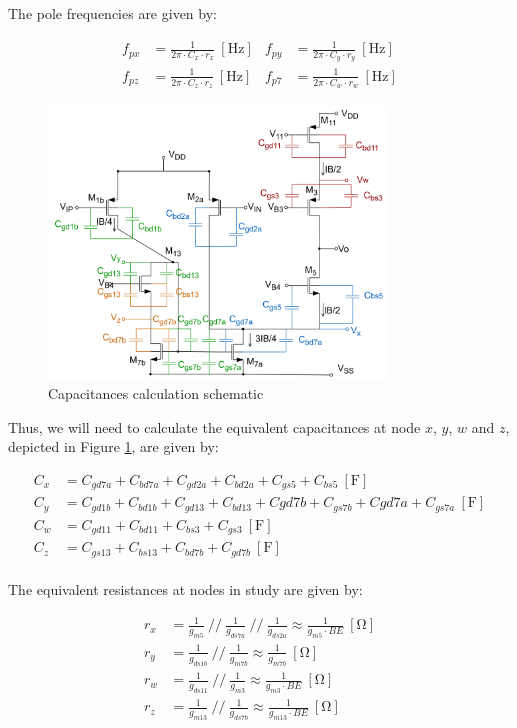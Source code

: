 The pole frequencies are given by:

\begin{align}
    f_{px} &= \frac{1}{2\pi \cdot C_x \cdot r_x} \ [\si{\hertz}] &
    f_{py} &= \frac{1}{2\pi \cdot C_y \cdot r_y} \ [\si{\hertz}] \\
    f_{pz} &= \frac{1}{2\pi \cdot C_z \cdot r_z} \ [\si{\hertz}] &
    f_{p7} &= \frac{1}{2\pi \cdot C_w \cdot r_w} \ [\si{\hertz}]
    \label{eq:poles}
\end{align}

\begin{figure}[H]
    \centering
    \includegraphics[width=0.8\textwidth]{Images/pole_freqs.png}
    \caption{Capacitances calculation schematic}
    \label{fig:poles_sch}
\end{figure}

Thus, we will need to calculate the equivalent capacitances at node $x$, $y$, $w$ and $z$, depicted in Figure \ref{fig:poles_sch}, are given by:

\begin{align}
    C_x &= C_{gd7a} + C_{bd7a}+ C_{gd2a} + C_{bd2a} + C_{gs5} + C_{bs5} \ [\si{\farad}] \\
    C_y &= C_{gd1b} + C_{bd1b} + C_{gd13} + C_{bd13} + C{gd7b} + C_{gs7b} + C{gd7a} + C_{gs7a}\ [\si{\farad}] \\
    C_w &= C_{gd11} + C_{bd11} + C_{bs3}+ C_{gs3} \ [\si{\farad}] \\
    C_z &= C_{gs13} + C_{bs13} + C_{bd7b}+ C_{gd7b} \ [\si{\farad}] 
    \label{eq:capacitances}
\end{align}
\\
The equivalent resistances at nodes in study are given by:

\begin{align}
    r_x &= \frac{1}{g_{m5}} \ // \ \frac{1}{g_{ds7a}} \ // \ \frac{1}{g_{ds2a}}\approx \frac{1}{g_{m5} \cdot BE} \ [\si{\ohm}]\\
    r_y &= \frac{1}{g_{ds1b}} \ // \ \frac{1}{g_{m7b}} \approx \frac{1}{g_{m7b}} \ [\si{\ohm}]\\
    r_w &= \frac{1}{g_{ds11}} \ // \ \frac{1}{g_{m3}} \approx \frac{1}{g_{m3} \cdot BE} \ [\si{\ohm}]\\
    r_z &= \frac{1}{g_{m13}} \ // \ \frac{1}{g_{ds7b}} \approx \frac{1}{g_{m13} \cdot BE} \ [\si{\ohm}]
    \label{eq:resistances}
\end{align}

